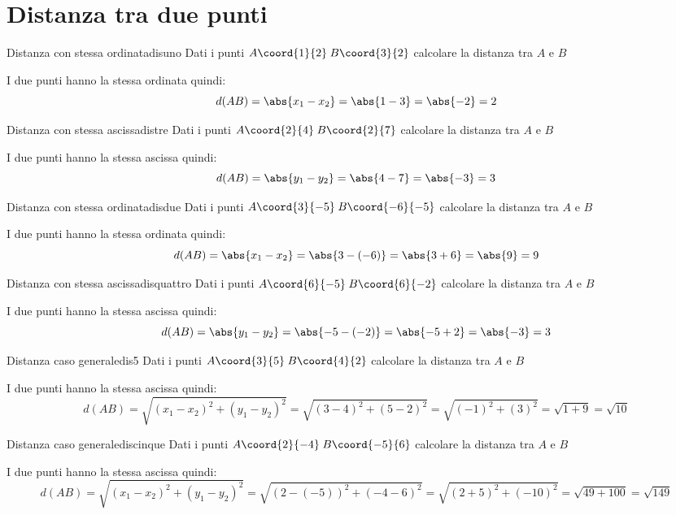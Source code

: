 \chapter{Distanza tra due punti}
\label{cha:DistanzaTraduePunti}
\begin{esempiot}{Distanza con stessa ordinata}{disuno}
Dati i punti $A\coord{1}{2}$\,$B\coord{3}{2}$ calcolare la distanza tra $A$ e $B$
\end{esempiot}
I due punti hanno la stessa ordinata quindi:
\begin{equation*}
d(AB)=\abs{x_1-x_2}=\abs{1-3}=\abs{-2}=2
\end{equation*}
\begin{esempiot}{Distanza con stessa ascissa}{distre}
	Dati i punti $A\coord{2}{4}$\,$B\coord{2}{7}$ calcolare la distanza tra $A$ e $B$
\end{esempiot}
I due punti hanno la stessa ascissa quindi: 
\begin{equation*}
	d(AB)=\abs{y_1-y_2}=\abs{4-7}=\abs{-3}=3
\end{equation*}
\begin{esempiot}{Distanza con stessa ordinata}{disdue}
	Dati i punti $A\coord{3}{-5}$\,$B\coord{-6}{-5}$ calcolare la distanza tra $A$ e $B$
\end{esempiot}
I due punti hanno la stessa ordinata quindi: 
\begin{equation*}
d(AB)=\abs{x_1-x_2}=\abs{3-(-6)}=\abs{3+6}=\abs{9}=9
\end{equation*}

\begin{esempiot}{Distanza con stessa ascissa}{disquattro}
	Dati i punti $A\coord{6}{-5}$\,$B\coord{6}{-2}$ calcolare la distanza tra $A$ e $B$
\end{esempiot}
I due punti hanno la stessa ascissa quindi: 
\begin{equation*}
d(AB)=\abs{y_1-y_2}=\abs{-5-(-2)}=\abs{-5+2}=\abs{-3}=3
\end{equation*}
\begin{esempiot}{Distanza caso generale}{dis5}
	Dati i punti $A\coord{3}{5}$\,$B\coord{4}{2}$ calcolare la distanza tra $A$ e $B$
\end{esempiot}
I due punti hanno la stessa ascissa quindi: 
\begin{equation*}
d(AB)=\sqrt{(x_1-x_2)^2+(y_1-y_2)^2}=\sqrt{(3-4)^2+(5-2)^2}=\sqrt{(-1)^2+(3)^2}=\sqrt{1+9}=\sqrt{10}
\end{equation*}
\begin{esempiot}{Distanza caso generale}{discinque}
	Dati i punti $A\coord{2}{-4}$\,$B\coord{-5}{6}$ calcolare la distanza tra $A$ e $B$
\end{esempiot}
I due punti hanno la stessa ascissa quindi: 
\begin{equation*}
d(AB)=\sqrt{(x_1-x_2)^2+(y_1-y_2)^2}=\sqrt{(2-(-5))^2+(-4-6)^2}=\sqrt{(2+5)^2+(-10)^2}=\sqrt{49+100}=\sqrt{149}
\end{equation*}
